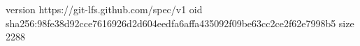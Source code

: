 version https://git-lfs.github.com/spec/v1
oid sha256:98fe38d92cce7616926d2d604eedfa6affa435092f09be63cc2ce2f62e7998b5
size 2288
